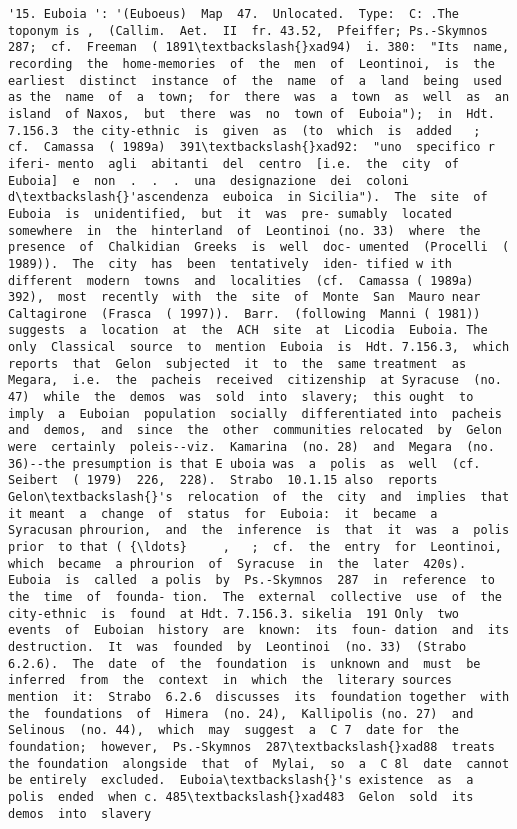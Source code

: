 \documentclass[11pt]{article}
\begin{document}
\begin{Verbatim}[commandchars=\\\{\}]
         '15. Euboia ': '(Euboeus)  Map  47.  Unlocated.  Type:  C: .The toponym is ,  (Callim.  Aet.  II  fr. 43.52,  Pfeiffer; Ps.-Skymnos  287;  cf.  Freeman  ( 1891\textbackslash{}xad94)  i. 380:  "Its  name, recording  the  home-memories  of  the  men  of  Leontinoi,  is  the earliest  distinct  instance  of  the  name  of  a  land  being  used  as the  name  of  a  town;  for  there  was  a  town  as  well  as  an  island  of Naxos,  but  there  was  no  town of  Euboia");  in  Hdt. 7.156.3  the city-ethnic  is  given  as  (to  which  is  added   ;  cf.  Camassa  ( 1989a)  391\textbackslash{}xad92:  "uno  specifico r iferi- mento  agli  abitanti  del  centro  [i.e.  the  city  of  Euboia]  e  non  .  .  .  una  designazione  dei  coloni  d\textbackslash{}'ascendenza  euboica  in Sicilia").  The  site  of  Euboia  is  unidentified,  but  it  was  pre- sumably  located  somewhere  in  the  hinterland  of  Leontinoi (no. 33)  where  the  presence  of  Chalkidian  Greeks  is  well  doc- umented  (Procelli  ( 1989)).  The  city  has  been  tentatively  iden- tified w ith  different  modern  towns  and  localities  (cf.  Camassa ( 1989a)  392),  most  recently  with  the  site  of  Monte  San  Mauro near  Caltagirone  (Frasca  ( 1997)).  Barr.  (following  Manni ( 1981))  suggests  a  location  at  the  ACH  site  at  Licodia  Euboia. The  only  Classical  source  to  mention  Euboia  is  Hdt. 7.156.3,  which  reports  that  Gelon  subjected  it  to  the  same treatment  as  Megara,  i.e.  the  pacheis  received  citizenship  at Syracuse  (no. 47)  while  the  demos  was  sold  into  slavery;  this ought  to  imply  a  Euboian  population  socially  differentiated into  pacheis  and  demos,  and  since  the  other  communities relocated  by  Gelon  were  certainly  poleis--viz.  Kamarina  (no. 28)  and  Megara  (no. 36)--the presumption is that E uboia was  a  polis  as  well  (cf.  Seibert  ( 1979)  226,  228).  Strabo  10.1.15 also  reports  Gelon\textbackslash{}'s  relocation  of  the  city  and  implies  that  it meant  a  change  of  status  for  Euboia:  it  became  a  Syracusan phrourion,  and  the  inference  is  that  it  was  a  polis  prior  to that ( {\ldots}     ,   ;  cf.  the  entry  for  Leontinoi,  which  became  a phrourion  of  Syracuse  in  the  later  420s).  Euboia  is  called  a polis  by  Ps.-Skymnos  287  in  reference  to the  time  of  founda- tion.  The  external  collective  use  of  the  city-ethnic  is  found  at Hdt. 7.156.3. sikelia  191 Only  two  events  of  Euboian  history  are  known:  its  foun- dation  and  its  destruction.  It  was  founded  by  Leontinoi  (no. 33)  (Strabo  6.2.6).  The  date  of  the  foundation  is  unknown and  must  be  inferred  from  the  context  in  which  the  literary sources  mention  it:  Strabo  6.2.6  discusses  its  foundation together  with  the  foundations  of  Himera  (no. 24),  Kallipolis (no. 27)  and  Selinous  (no. 44),  which  may  suggest  a  C 7  date for  the  foundation;  however,  Ps.-Skymnos  287\textbackslash{}xad88  treats  the foundation  alongside  that  of  Mylai,  so  a  C 8l  date  cannot  be entirely  excluded.  Euboia\textbackslash{}'s existence  as  a  polis  ended  when c. 485\textbackslash{}xad483  Gelon  sold  its  demos  into  slavery  
\end{Verbatim}
\end{document}
